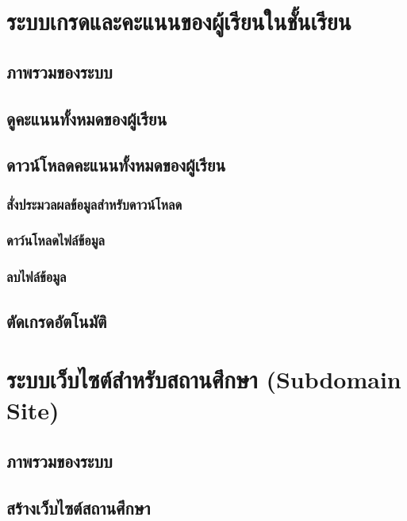 \documentclass[12pt,oneside]{book}
\begin{document}
\chapter{ระบบเกรดและคะแนนของผู้เรียนในชั้นเรียน}

\section{ภาพรวมของระบบ}

\section{ดูคะแนนทั้งหมดของผู้เรียน}

\section{ดาวน์โหลดคะแนนทั้งหมดของผู้เรียน}

\subsection{สั่งประมวลผลข้อมูลสำหรับดาวน์โหลด}

\subsection{ดาว์นโหลดไฟล์ข้อมูล}

\subsection{ลบไฟล์ข้อมูล}

\section{ตัดเกรดอัตโนมัติ}

\chapter{ระบบเว็บไซต์สำหรับสถานศึกษา (Subdomain Site)}

\section{ภาพรวมของระบบ}

\section{สร้างเว็บไซต์สถานศึกษา}
\end{document}
